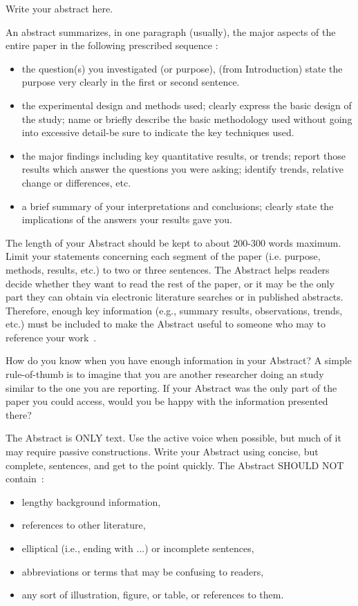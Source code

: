 \documentclass{winslabreport}
\begin{document}
\restoregeometry
\maketitle

\summary
Write your abstract here.

An abstract summarizes, in one paragraph (usually), the major aspects of the entire paper in the following prescribed sequence \cite{Anderson2016}:
\begin{itemize}
    \item the question(s) you investigated (or purpose), (from Introduction)
          state the purpose very clearly in the first or second sentence.
    \item the experimental design and methods used; clearly express the basic design of the study; name or briefly describe the basic methodology used without going into excessive detail-be sure to indicate the key techniques used.
    \item the major findings including key quantitative results, or trends; report those results which answer the questions you were asking; identify trends, relative change or differences, etc.
    \item a brief summary of your interpretations and conclusions; clearly state the implications of the answers your results gave you.
\end{itemize}

The length of your Abstract should be kept to about 200-300 words maximum. Limit your statements concerning each segment of the paper (i.e. purpose, methods, results, etc.) to two or three sentences. The Abstract helps readers decide whether they want to read the rest of the paper, or it may be the only part they can obtain via electronic literature searches or in published abstracts. Therefore, enough key information (e.g., summary results, observations, trends, etc.) must be included to make the Abstract useful to someone who may to reference your work~\cite{Anderson2016}.

How do you know when you have enough information in your Abstract? A simple rule-of-thumb is to imagine that you are another researcher doing an study similar to the one you are reporting. If your Abstract was the only part of the paper you could access, would you be happy with the information presented there?

The Abstract is ONLY text. Use the active voice when possible, but much of it may require passive constructions. Write your Abstract using concise, but complete, sentences, and get to the point quickly. The Abstract SHOULD NOT contain~\cite{Anderson2016}:
\begin{itemize}
    \item  lengthy background information,
    \item  references to other literature,
    \item  elliptical (i.e., ending with ...) or incomplete sentences,
    \item  abbreviations or terms that may be confusing to readers,
    \item  any sort of illustration, figure, or table, or references to them.
\end{itemize}
\end{document}
